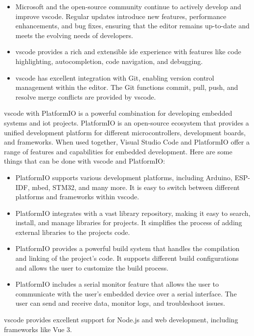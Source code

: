 \begin{itemize}
  \item Microsoft and the open-source community continue to actively develop and improve \gls{vscode}. Regular updates introduce new features, performance enhancements, and bug fixes, ensuring that the editor remains up-to-date and meets the evolving needs of developers.
  \item \gls{vscode} provides a rich and extensible \gls{ide} experience with features like code highlighting, autocompletion, code navigation, and debugging.
  \item \gls{vscode} has excellent integration with Git, enabling version control management within the editor. The Git functions commit, pull, push, and resolve merge conflicts are provided by \gls{vscode}.
\end{itemize}
\gls{vscode} with PlatformIO is a powerful combination for developing embedded systems and \gls{iot} projects. PlatformIO is an open-source ecosystem that provides a unified development platform for different microcontrollers, development boards, and frameworks. When used together, Visual Studio Code and PlatformIO offer a range of features and capabilities for embedded development. Here are some things that can be done with \gls{vscode} and PlatformIO:
\begin{itemize}
  \item PlatformIO supports various development platforms, including Arduino, ESP-IDF, mbed, STM32, and many more. It is easy to switch between different platforms and frameworks within \gls{vscode}.
  \item PlatformIO integrates with a vast library repository, making it easy to search, install, and manage libraries for projects. It simplifies the process of adding external libraries to the projects code.
  \item PlatformIO provides a powerful build system that handles the compilation and linking of the project's code. It supports different build configurations and allows the user to customize the build process.
  \item PlatformIO includes a serial monitor feature that allows the user to communicate with the user's embedded device over a serial interface. The user can send and receive data, monitor logs, and troubleshoot issues.
\end{itemize}
\gls{vscode} provides excellent support for Node.js and web development, including frameworks like Vue 3. 

